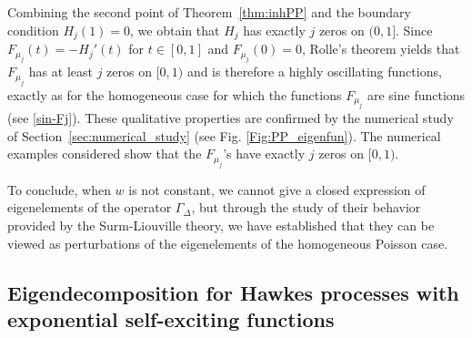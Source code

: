 \documentclass[aos]{imsart}
\theoremstyle{plain}
\theoremstyle{remark}
\newcommand{\1}{1}
\begin{document}
Combining the second point of Theorem~\ref{thm:inhPP} and the boundary condition $H_j(1)=0$, we obtain that $H_j$ has exactly $j$ zeros on $(0,1]$. Since $F_{\mu_j}(t)=-H_j'(t)$ for $t\in [0,1]$ and $F_{\mu_j}(0)=0$, Rolle's theorem yields that $F_{\mu_j}$ has at least $j$ zeros on $[0,1)$ and is therefore a highly oscillating functions, exactly as for the homogeneous case for which the functions $F_{\mu_j}$ are sine functions (see \eqref{sin-Fj}). These qualitative properties are confirmed by the numerical study of Section~\ref{sec:numerical_study} (see Fig.  \ref{Fig:PP_eigenfun}). The numerical examples considered show that the $F_{\mu_j}$'s have exactly $j$ zeros on $[0,1)$.

To conclude, when $w$ is not constant, we cannot give a closed expression of eigenelements of the operator $\Gamma_\Delta$, but through the study of their behavior provided by the Surm-Liouville theory, we have established that they can be viewed as perturbations of the eigenelements of the homogeneous Poisson case.

\subsection{Eigendecomposition for Hawkes processes with exponential self-exciting functions}\label{sec:Hawkes}
\end{document}
